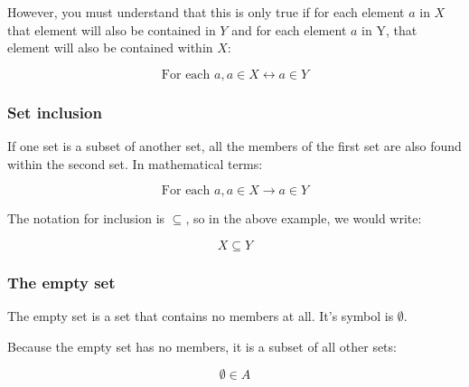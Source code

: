 However, you must understand that this is only true if for each element $a$ in
$X$ that element will also be contained in $Y$ and for each element $a$ in Y,
that element will also be contained within $X$:


\begin{dmath}
	\textrm{For each }a, a \in X \leftrightarrow a \in Y
\end{dmath}

\subsubsection{Set inclusion}

If one set is a subset of another set, all the members of the first set are also
found within the second set. In mathematical terms:

\begin{dmath}
	\textrm{For each }a, a \in X \rightarrow a \in Y
\end{dmath}

The notation for inclusion is $\subseteq$, so in the above example, we would
write:


\begin{dmath}
	X \subseteq Y
\end{dmath}

\subsubsection{The empty set}
\label{subsubsec:empty_set}

The empty set is a set that contains no members at all. It's symbol is
$\emptyset$.

Because the empty set has no members, it is a subset of all other sets:


\begin{dmath}
	\emptyset \in A
\end{dmath}

